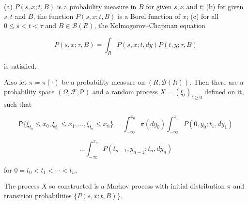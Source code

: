 (a) $P(s, x; t, B)$ is a probability measure in $B$ for given $s, x$ and $t$;
(b) for given $s, t$ and $B$, the function $P(s, x; t, B)$ is a Borel function of $x$;
(c) for all $0 \leq s < t < \tau$ and $B \in \mathcal{B}(R)$, the Kolmogorov–Chapman equation

$$P(s, x; \tau, B) = \int_{R} P(s, x; t, dy) P(t, y; \tau, B)$$

is satisfied.

Also let $\pi = \pi(\cdot)$ be a probability measure on $(R, \mathcal{B}(R))$. Then there are a probability space $(\Omega, \mathcal{F}, \mathsf{P})$ and a random process $X = (\xi_t)_{t \geq 0}$ defined on it, such that

$$\mathsf{P}\{\xi_t_0 \leq x_0, \xi_t_1 \leq x_1, \ldots, \xi_t_n \leq x_n\} = \int_{-\infty}^{x_0} \pi(dy_0) \int_{-\infty}^{x_1} P(0, y_0; t_1, dy_1)$$

$$\ldots \int_{-\infty}^{x_n} P(t_{n-1}, y_{n-1}; t_n, dy_n)$$

for $0 = t_0 < t_1 < \cdots < t_n$.

The process $X$ so constructed is a Markov process with initial distribution $\pi$ and transition probabilities $\{P(s, x; t, B)\}$.
